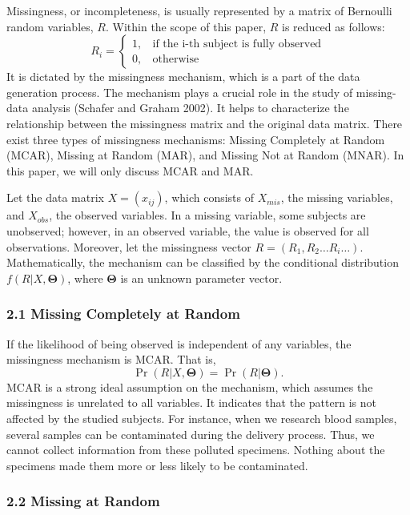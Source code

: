 \documentclass[
  12pt,
]{article}
\begin{document}
Missingness, or incompleteness, is usually represented by a matrix of
Bernoulli random variables, \(R\). Within the scope of this paper, \(R\)
is reduced as follows: \[
R_{i} = \begin{cases}
1,~~~~\text{if the i-th subject is fully observed} \\
0,~~~~\text{otherwise}
\end{cases}
\] It is dictated by the missingness mechanism, which is a part of the
data generation process. The mechanism plays a crucial role in the study
of missing-data analysis (Schafer and Graham 2002). It helps to
characterize the relationship between the missingness matrix and the
original data matrix. There exist three types of missingness mechanisms:
Missing Completely at Random (MCAR), Missing at Random (MAR), and
Missing Not at Random (MNAR). In this paper, we will only discuss MCAR
and MAR.

Let the data matrix \(X = (x_{ij})\), which consists of \(X_{mis}\), the
missing variables, and \(X_{obs}\), the observed variables. In a missing
variable, some subjects are unobserved; however, in an observed
variable, the value is observed for all observations. Moreover, let the
missingness vector \(R = (R_{1}, R_{2} \ldots R_{i} \ldots)\).
Mathematically, the mechanism can be classified by the conditional
distribution \(f(R|X, \boldsymbol\Theta)\), where \(\boldsymbol\Theta\)
is an unknown parameter vector.

\hypertarget{missing-completely-at-random}{%
\subsubsection{2.1 Missing Completely at
Random}\label{missing-completely-at-random}}

If the likelihood of being observed is independent of any variables, the
missingness mechanism is MCAR. That is, \[
\Pr(R|X, \boldsymbol\Theta) = \Pr(R| \boldsymbol\Theta).
\] MCAR is a strong ideal assumption on the mechanism, which assumes the
missingness is unrelated to all variables. It indicates that the pattern
is not affected by the studied subjects. For instance, when we research
blood samples, several samples can be contaminated during the delivery
process. Thus, we cannot collect information from these polluted
specimens. Nothing about the specimens made them more or less likely to
be contaminated.

\hypertarget{missing-at-random}{%
\subsubsection{2.2 Missing at Random}\label{missing-at-random}}
\end{document}

